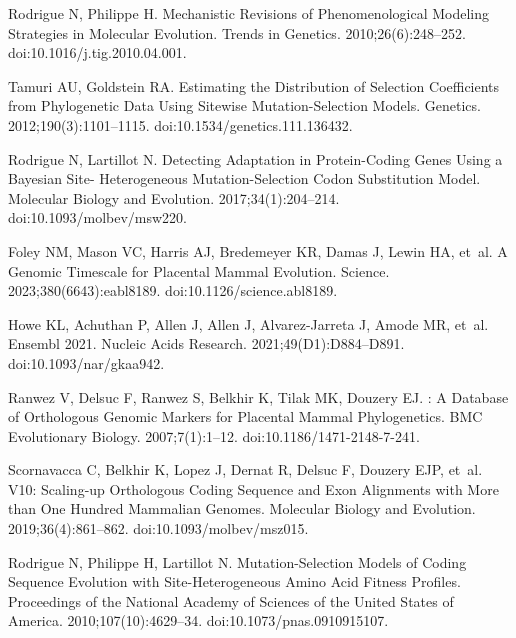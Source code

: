 \documentclass[10pt,letterpaper]{article}
\begin{document}
\begin{thebibliography}{10}
Rodrigue N, Philippe H.
\newblock Mechanistic Revisions of Phenomenological Modeling Strategies in
Molecular Evolution.
\newblock Trends in Genetics. 2010;26(6):248--252.
\newblock doi:{10.1016/j.tig.2010.04.001}.

Tamuri AU, Goldstein RA.
\newblock Estimating the Distribution of Selection Coefficients from
Phylogenetic Data Using Sitewise Mutation-Selection Models.
\newblock Genetics. 2012;190(3):1101--1115.
\newblock doi:{10.1534/genetics.111.136432}.

Rodrigue N, Lartillot N.
\newblock Detecting Adaptation in Protein-Coding Genes Using a {{Bayesian}}
Site- Heterogeneous Mutation-Selection Codon Substitution Model.
\newblock Molecular Biology and Evolution. 2017;34(1):204--214.
\newblock doi:{10.1093/molbev/msw220}.

Foley NM, Mason VC, Harris AJ, Bredemeyer KR, Damas J, Lewin HA, et~al.
\newblock A Genomic Timescale for Placental Mammal Evolution.
\newblock Science. 2023;380(6643):eabl8189.
\newblock doi:{10.1126/science.abl8189}.

Howe KL, Achuthan P, Allen J, Allen J, {Alvarez-Jarreta} J, Amode MR, et~al.
\newblock Ensembl 2021.
\newblock Nucleic Acids Research. 2021;49(D1):D884--D891.
\newblock doi:{10.1093/nar/gkaa942}.

Ranwez V, Delsuc F, Ranwez S, Belkhir K, Tilak MK, Douzery EJ.
: {{A}} Database of Orthologous Genomic Markers for
Placental Mammal Phylogenetics.
\newblock BMC Evolutionary Biology. 2007;7(1):1--12.
\newblock doi:{10.1186/1471-2148-7-241}.

Scornavacca C, Belkhir K, Lopez J, Dernat R, Delsuc F, Douzery EJP, et~al.
 V10: {{Scaling-up}} Orthologous Coding Sequence and Exon
Alignments with More than One Hundred Mammalian Genomes.
\newblock Molecular Biology and Evolution. 2019;36(4):861--862.
\newblock doi:{10.1093/molbev/msz015}.

Rodrigue N, Philippe H, Lartillot N.
\newblock Mutation-Selection Models of Coding Sequence Evolution with
Site-Heterogeneous Amino Acid Fitness Profiles.
\newblock Proceedings of the National Academy of Sciences of the United States
of America. 2010;107(10):4629--34.
\newblock doi:{10.1073/pnas.0910915107}.


\end{thebibliography}
\end{document}
